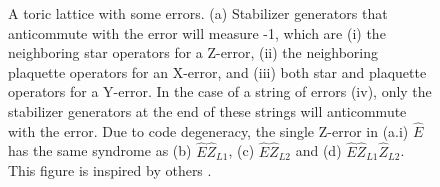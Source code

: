 \begin{figure}[htbp]
    \hspace{1cm}
    \caption{A toric lattice with some errors. (a) Stabilizer generators that anticommute with the error will measure -1, which are (i) the neighboring star operators for a Z-error, (ii) the neighboring plaquette operators for an X-error, and (iii) both star and plaquette operators for a Y-error. In the case of a string of errors (iv), only the stabilizer generators at the end of these strings will anticommute with the error. Due to code degeneracy, the single Z-error in (a.i) $\hat{E}$ has the same syndrome as (b) $\hat{E}\hat{Z}_{L1}$, (c) $\hat{E}\hat{Z}_{L2}$ and (d) $\hat{E}\hat{Z}_{L1}\hat{Z}_{L2}$. This figure is inspired by others \cite{browne}.}\label{sf:fig_degenerate}
  \end{figure}